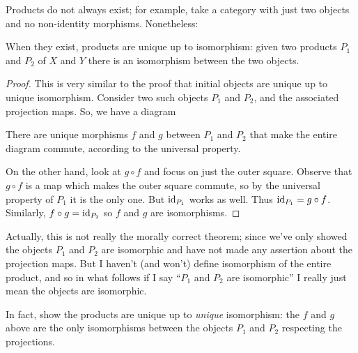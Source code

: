 Products do not always exist; for example,
take a category with just two objects and no non-identity morphisms.
Nonetheless:
\begin{proposition}
	When they exist, products are unique up to isomorphism:
	given two products $P_1$ and $P_2$ of $X$ and $Y$
	there is an isomorphism between the two objects.
\end{proposition}
\begin{proof}
	This is very similar to the proof that initial objects are unique up to unique isomorphism.
	Consider two such objects $P_1$ and $P_2$, and the associated projection maps.
	So, we have a diagram
	\begin{center}
	\end{center}
	There are unique morphisms $f$ and $g$ between $P_1$ and $P_2$ that
	make the entire diagram commute, according to the universal property.

	On the other hand, look at $g \circ f$ and focus on just the outer square.
	Observe that $g \circ f$ is a map which makes the outer square commute,
	so by the universal property of $P_1$ it is the only one.
	But $\mathrm{id}_{P_1}$ works as well.
	Thus $\mathrm{id}_{P_1} = g \circ f$.
	Similarly, $f \circ g = \mathrm{id}_{P_2}$ so $f$ and $g$ are isomorphisms.
\end{proof}
\begin{abuse}
	Actually, this is not really the morally correct theorem;
	since we've only showed the objects $P_1$ and $P_2$ are isomorphic
	and have not made any assertion about the projection maps.
	But I haven't (and won't) define isomorphism of the entire product,
	and so in what follows if I say ``$P_1$ and $P_2$ are isomorphic''
	I really just mean the objects are isomorphic.
\end{abuse}
\begin{exercise}
	In fact, show the products are unique up to \emph{unique} isomorphism:
	the $f$ and $g$ above are the only isomorphisms between
	the objects $P_1$ and $P_2$ respecting the projections.
\end{exercise}

